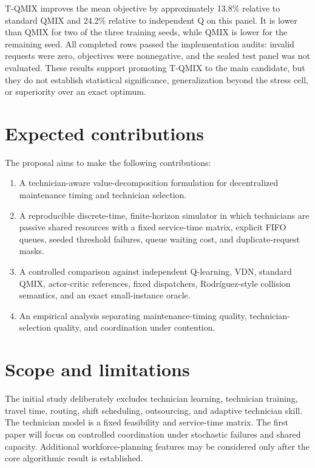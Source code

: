 \documentclass[11pt]{article}
\begin{document}
T-QMIX improves the mean objective by approximately 13.8\% relative to standard QMIX and 24.2\% relative to independent Q on this panel. It is lower than QMIX for two of the three training seeds, while QMIX is lower for the remaining seed. All completed rows passed the implementation audits: invalid requests were zero, objectives were nonnegative, and the sealed test panel was not evaluated. These results support promoting T-QMIX to the main candidate, but they do not establish statistical significance, generalization beyond the stress cell, or superiority over an exact optimum.

\section{Expected contributions}

The proposal aims to make the following contributions:

\begin{enumerate}[leftmargin=*]
    \item A technician-aware value-decomposition formulation for decentralized maintenance timing and technician selection.
    \item A reproducible discrete-time, finite-horizon simulator in which technicians are passive shared resources with a fixed service-time matrix, explicit FIFO queues, seeded threshold failures, queue waiting cost, and duplicate-request masks.
    \item A controlled comparison against independent Q-learning, VDN, standard QMIX, actor-critic references, fixed dispatchers, Rodríguez-style collision semantics, and an exact small-instance oracle.
    \item An empirical analysis separating maintenance-timing quality, technician-selection quality, and coordination under contention.
\end{enumerate}

\section{Scope and limitations}

The initial study deliberately excludes technician learning, technician training, travel time, routing, shift scheduling, outsourcing, and adaptive technician skill. The technician model is a fixed feasibility and service-time matrix. The first paper will focus on controlled coordination under stochastic failures and shared capacity. Additional workforce-planning features may be considered only after the core algorithmic result is established.
\end{document}
